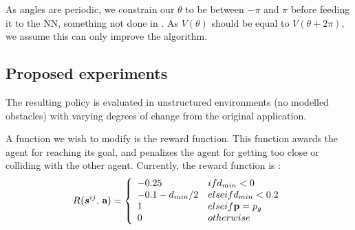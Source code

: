 \documentclass[conference]{IEEEtran}
\begin{document}
As angles are periodic, we constrain our $\theta$ to be between $-\pi$ and $\pi$ before feeding it to the NN, something not done in \cite{chen2017cadrl}. As $V(\theta)$ should be equal to $V(\theta+2\pi)$, we assume this can only improve the algorithm. 



\subsection{Proposed experiments}
The resulting policy is evaluated in unstructured environments (no modelled obstacles) with varying degrees of change from the original application.\\

A function we wish to modify is the reward function. This function awards
the agent for reaching its goal, and penalizes the agent for
getting too close or colliding with the other agent.
Currently, the reward function is :
\begin{equation} 
\Reward{}(\state{ij}{}, \, \textbf{a})=
\left\{
    \begin{array}{ll}
        -0.25 & \mbox{if } d_{min}<0  \\
        -0.1 - d_{min}/2 & \mbox{else if } d_{min}<0.2\\
        1 & \mbox{else if }  \textbf{p}=p_{g} \\
        0 & \mbox{otherwise }\\
    \end{array}
\right. 
\label{eqn:reward1}
\end{equation}
\end{document}
